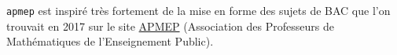 %

\verb+apmep+ est inspiré très fortement de la mise en forme des sujets de BAC que l'on trouvait en 2017 sur le site \href{https://www.apmep.fr}{APMEP} (Association des Professeurs de Mathématiques de l'Enseignement Public).
